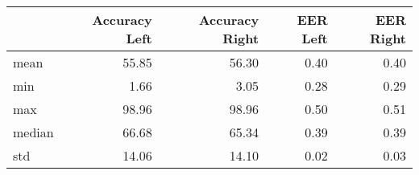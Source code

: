 \begin{tabular}{lrrrr}
\toprule
{} &  Accuracy Left &  Accuracy Right &  EER Left &  EER Right \\
\midrule
mean   &          55.85 &           56.30 &      0.40 &       0.40 \\
min    &           1.66 &            3.05 &      0.28 &       0.29 \\
max    &          98.96 &           98.96 &      0.50 &       0.51 \\
median &          66.68 &           65.34 &      0.39 &       0.39 \\
std    &          14.06 &           14.10 &      0.02 &       0.03 \\
\bottomrule
\end{tabular}
